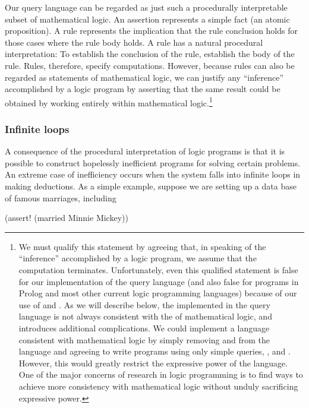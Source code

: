 Our query language can be regarded as just such a procedurally interpretable
subset of mathematical logic.  An assertion represents a simple fact (an atomic
proposition).  A rule represents the implication that the rule conclusion holds
for those cases where the rule body holds.  A rule has a natural procedural
interpretation: To establish the conclusion of the rule, establish the body of
the rule.  Rules, therefore, specify computations.  However, because rules can
also be regarded as statements of mathematical logic, we can justify any
``inference'' accomplished by a logic program by asserting that the same result
could be obtained by working entirely within mathematical logic.\footnote{We
must qualify this statement by agreeing that, in speaking of the ``inference''
accomplished by a logic program, we assume that the computation terminates.
Unfortunately, even this qualified statement is false for our implementation of
the query language (and also false for programs in Prolog and most other
current logic programming languages) because of our use of  and
.  As we will describe below, the  implemented in
the query language is not always consistent with the  of mathematical
logic, and  introduces additional complications.  We could
implement a language consistent with mathematical logic by simply removing
 and  from the language and agreeing to write
programs using only simple queries, , and .  However, this
would greatly restrict the expressive power of the language.  One of the major
concerns of research in logic programming is to find ways to achieve more
consistency with mathematical logic without unduly sacrificing expressive
power.}

\subsubsection*{Infinite loops}

A consequence of the procedural interpretation of logic programs is that it is
possible to construct hopelessly inefficient programs for solving certain
problems.  An extreme case of inefficiency occurs when the system falls into
infinite loops in making deductions.  As a simple example, suppose we are
setting up a data base of famous marriages, including

\begin{codeBlock}
(assert! (married Minnie Mickey))
\end{codeBlock}

